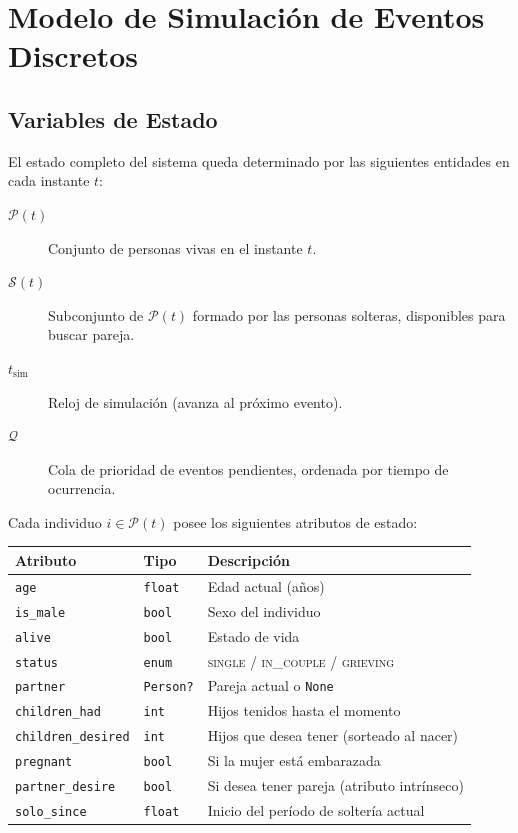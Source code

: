 \documentclass[12pt, a4paper]{article}
\newcommand{\code}[1]{\texttt{#1}}
\begin{document}
\section{Modelo de Simulación de Eventos Discretos}

\subsection{Variables de Estado}

El estado completo del sistema queda determinado por las siguientes entidades
en cada instante $t$:

\begin{description}
  \item[$\mathcal{P}(t)$] Conjunto de personas vivas en el instante $t$.
  \item[$\mathcal{S}(t)$] Subconjunto de $\mathcal{P}(t)$ formado por las
        personas solteras, disponibles para buscar pareja.
  \item[$t_\mathrm{sim}$] Reloj de simulación (avanza al próximo evento).
  \item[$\mathcal{Q}$] Cola de prioridad de eventos pendientes, ordenada
        por tiempo de ocurrencia.
\end{description}

Cada individuo $i \in \mathcal{P}(t)$ posee los siguientes atributos de estado:

\begin{center}
\begin{tabular}{@{}lll@{}}
  \toprule
  \textbf{Atributo}        & \textbf{Tipo}   & \textbf{Descripción} \\
  \midrule
  \code{age}               & \code{float}    & Edad actual (años) \\
  \code{is\_male}          & \code{bool}     & Sexo del individuo \\
  \code{alive}             & \code{bool}     & Estado de vida \\
  \code{status}            & \code{enum}     & \textsc{single} / \textsc{in\_couple} / \textsc{grieving} \\
  \code{partner}           & \code{Person?}  & Pareja actual o \code{None} \\
  \code{children\_had}     & \code{int}      & Hijos tenidos hasta el momento \\
  \code{children\_desired} & \code{int}      & Hijos que desea tener (sorteado al nacer) \\
  \code{pregnant}          & \code{bool}     & Si la mujer está embarazada \\
  \code{partner\_desire}   & \code{bool}     & Si desea tener pareja (atributo intrínseco) \\
  \code{solo\_since}       & \code{float}    & Inicio del período de soltería actual \\
  \bottomrule
\end{tabular}
\end{center}
\end{document}
